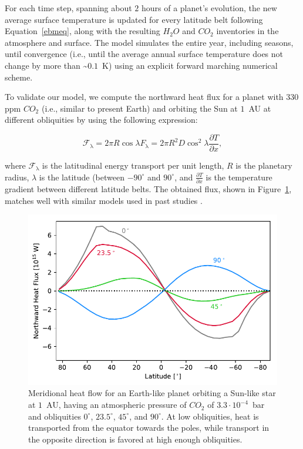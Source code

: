 \documentclass[fleqn,usenatbib]{mnras}
\begin{document}
For each time step, spanning about $2$ hours of a planet's evolution, the new average surface temperature is updated for every latitude belt following Equation~\ref{ebmeq}, along with the resulting $H_{\mathrm{2}}O$ and $CO_{\mathrm{2}}$ inventories in the atmosphere and surface. The model simulates the entire year, including seasons, until convergence (i.e., until the average annual surface temperature does not change by more than \textasciitilde$0.1$~K) using an explicit forward marching numerical scheme. 

To validate our model, we compute the northward heat flux for a planet with $330$ppm $CO_{\mathrm{2}}$ (i.e., similar to present Earth) and orbiting the Sun at $1$~AU at different obliquities by using the following expression:

\begin{equation}
    \mathcal{F}_{\mathrm{\lambda}}=2 \pi R \cos \lambda F_{\mathrm{\lambda}}=2 \pi R^{2} D \cos ^{2} \lambda \frac{\partial T}{\partial x},
\end{equation}

where $\mathcal{F}_{\mathrm{\lambda}}$ is the latitudinal energy transport per unit length, $R$ is the planetary radius, $\lambda$ is the latitude (between $-90^\circ$ and $90^\circ$, and $\frac{\partial T}{\partial x}$ is the temperature gradient between different latitude belts.
The obtained flux, shown in Figure~\ref{fig:flow}, matches well with similar models used in past studies \citep[e.g.,][]{WilliamsPollard}.

\begin{figure}
	\includegraphics[width=\columnwidth]{Figures/Meridional_flow.pdf}
    \caption{Meridional heat flow for an Earth-like planet  orbiting a Sun-like star at $1$~AU, having an atmospheric pressure of $CO_{\mathrm{2}}$ of $3.3\cdot10^{-4}$~bar and obliquities $0^\circ$, $23.5^\circ$, $45^\circ$, and $90^\circ$. At low obliquities, heat is transported from the equator towards the poles, while transport in the opposite direction is favored at high enough obliquities.}
    \label{fig:flow}
\end{figure}
\end{document}
